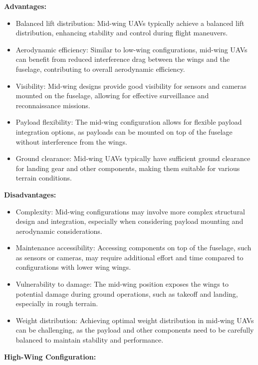 \documentclass[12 pt]{article}
\begin{document}
{\color{black}
\textbf{{Advantages:}}
\begin{itemize}
  \item Balanced lift distribution: Mid-wing UAVs typically achieve a balanced lift distribution, enhancing stability and control during flight maneuvers.
  \item Aerodynamic efficiency: Similar to low-wing configurations, mid-wing UAVs can benefit from reduced interference drag between the wings and the fuselage, contributing to overall aerodynamic efficiency.
  \item Visibility: Mid-wing designs provide good visibility for sensors and cameras mounted on the fuselage, allowing for effective surveillance and reconnaissance missions.
  \item Payload flexibility: The mid-wing configuration allows for flexible payload integration options, as payloads can be mounted on top of the fuselage without interference from the wings.
  \item Ground clearance: Mid-wing UAVs typically have sufficient ground clearance for landing gear and other components, making them suitable for various terrain conditions.
\end{itemize}

\textbf{{Disadvantages:}}
\begin{itemize}
  \item Complexity: Mid-wing configurations may involve more complex structural design and integration, especially when considering payload mounting and aerodynamic considerations.
  \item Maintenance accessibility: Accessing components on top of the fuselage, such as sensors or cameras, may require additional effort and time compared to configurations with lower wing wings.
  \item Vulnerability to damage: The mid-wing position exposes the wings to potential damage during ground operations, such as takeoff and landing, especially in rough terrain.
  \item Weight distribution: Achieving optimal weight distribution in mid-wing UAVs can be challenging, as the payload and other components need to be carefully balanced to maintain stability and performance.
\end{itemize}
}

{\textbf{High-Wing Configuration:}}
\end{document}
